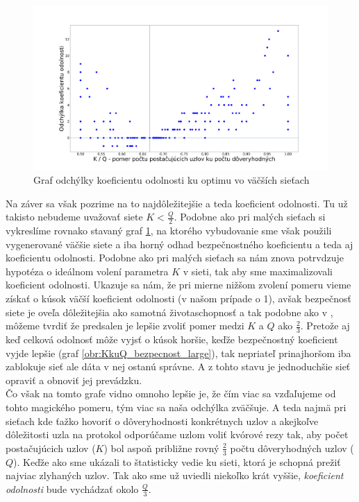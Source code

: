 \begin{figure}
\centerline{\includegraphics[width=1.2\textwidth]{images/KkuQ_odchylka_large.png}}
\caption{Graf odchýlky koeficientu odolnosti ku optimu vo väčších sieťach} \label{obr:KkuQ_odchylka_large}
\end{figure}

Na záver sa však pozrime na to najdôležitejšie a teda koeficient odolnosti.
Tu už takisto nebudeme uvažovať siete $K<\frac{Q}{2}$.
Podobne ako pri malých sieťach si vykreslíme rovnako stavaný graf
\ref{obr:KkuQ_odchylka_large}, na ktorého vybudovanie sme však použili vygenerované
väčšie siete a iba horný odhad bezpečnostného koeficientu a teda aj koeficientu
odolnosti.
Podobne ako pri malých sieťach sa nám znova potrvdzuje hypotéza o ideálnom
volení parametra $K$ v sieti, tak aby sme maximalizovali koeficient odolnosti.
Ukazuje sa nám, že pri mierne nižšom zvolení pomeru vieme získať o kúsok
väčší koeficient odolnosti (v našom prípade o 1), avšak bezpečnosť siete je oveľa
dôležitejšia ako samotná životaschopnosť a tak podobne ako v \cite{li2007beyond},
môžeme tvrdiť že predsalen je lepšie zvoliť pomer medzi $K$ a $Q$ ako $\frac{2}{3}$.
Pretože aj keď celková odolnosť môže vyjsť o kúsok horšie, keďže bezpečnostný koeficient
vyjde lepšie (graf \ref{obr:KkuQ_bezpecnost_large}), tak nepriateľ prinajhoršom iba
zablokuje sieť ale dáta v nej ostanú správne. A z tohto stavu je jednoduchšie sieť
opraviť a obnoviť jej prevádzku.\\
Čo však na tomto grafe vidno omnoho lepšie je, že čím viac sa vzďaľujeme od tohto
magického pomeru, tým viac sa naša odchýlka zväčšuje.
A teda najmä pri sieťach kde ťažko hovoriť o dôveryhodnosti konkrétnych uzlov
a akejkoľve dôležitosti uzla na protokol odporúčame uzlom voliť kvórové rezy
tak, aby počet postačujúcich uzlov ($K$) bol aspoň približne rovný $\frac{2}{3}$
počtu dôveryhodných uzlov ($Q$). Keďže ako sme ukázali to štatisticky vedie
ku sieti, ktorá je schopná prežiť najviac zlyhaných uzlov. Tak ako sme už uviedli
niekoľko krát vyššie, \textit{koeficient odolnosti} bude vychádzať okolo $\frac{Q}{3}$.